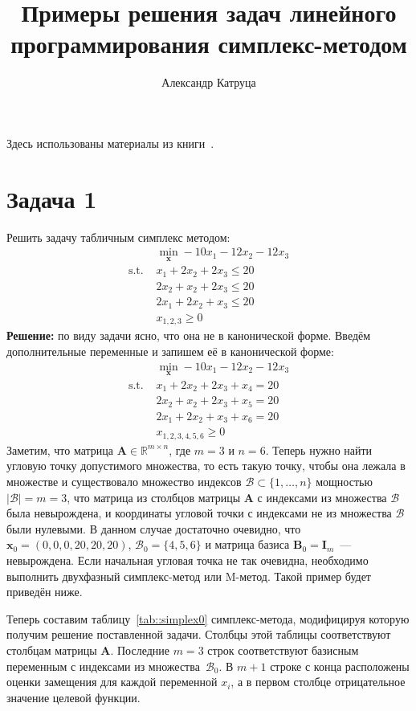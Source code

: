 \documentclass[12pt]{article}
\title{Примеры решения задач линейного программирования симплекс-методом}
\author{Александр Катруца}
\date{}
\newcommand{\bx}{\mathbf{x}}
\newcommand{\bA}{\mathbf{A}}
\begin{document}
\maketitle
Здесь использованы материалы из книги~\cite{intro2lin}. 
\section{Задача 1}
Решить задачу табличным симплекс методом:
\begin{equation*}
\begin{split}
& \min_{\bx} -10x_1 - 12x_2 - 12x_3\\
\text{s.t. } & x_1 + 2x_2 +2x_3 \leq 20\\
& 2x_2 + x_2 + 2x_3 \leq 20\\
& 2x_1 + 2x_2 + x_3 \leq 20\\
& x_{1,2,3} \geq 0
\end{split}
\end{equation*}
\textbf{Решение:} по виду задачи ясно, что она не в канонической  форме. Введём дополнительные переменные и запишем её в канонической форме:
\begin{equation*}
\begin{split}
& \min_{\bx} -10x_1 - 12x_2 - 12x_3\\
\text{s.t. } & x_1 + 2x_2 +2x_3 + x_4 = 20\\
& 2x_2 + x_2 + 2x_3 + x_5 = 20\\
& 2x_1 + 2x_2 + x_3 + x_6 = 20\\
& x_{1,2,3,4,5,6} \geq 0
\end{split}
\end{equation*}
Заметим, что матрица $\bA \in \mathbb{R}^{m \times n}$, где $m=3$ и $n=6$.
Теперь нужно найти угловую точку допустимого множества, то есть такую точку, чтобы она лежала в множестве и существовало множество индексов $\mathcal{B} \subset \{1, \dots, n\}$ мощностью $|\mathcal{B}| = m = 3$, что матрица из столбцов матрицы $\bA$ с индексами из множества $\mathcal{B}$ была невырождена, и координаты угловой точки с индексами не из множества $\mathcal{B}$ были нулевыми.
В данном случае достаточно очевидно, что $\bx_0 = (0, 0, 0, 20, 20, 20)$, $\mathcal{B}_0 = \{4, 5, 6 \}$ и матрица базиса $\mathbf{B}_0 = \mathbf{I}_m$~--- невырождена.
Если начальная угловая точка не так очевидна, необходимо выполнить двухфазный симплекс-метод или M-метод. 
Такой пример будет приведён ниже.

Теперь составим таблицу~\ref{tab::simplex0} симплекс-метода, модифицируя которую получим решение поставленной задачи.
Столбцы этой таблицы соответствуют столбцам матрицы $\bA$. 
Последние $m=3$ строк соответствуют базисным переменным с индексами из множества~$\mathcal{B}_0$.
В $m+1$ строке с конца расположены оценки замещения для каждой переменной $x_i$, а в первом столбце отрицательное значение целевой функции.
\end{document}
